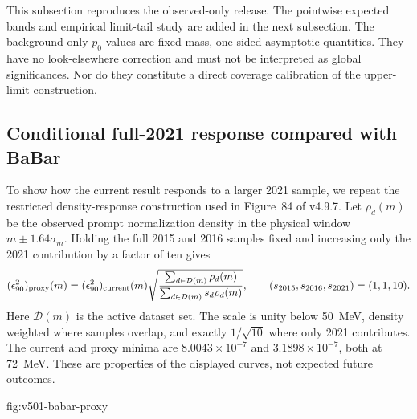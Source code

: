 This subsection reproduces the observed-only release. The pointwise expected
bands and empirical limit-tail study are added in the next subsection. The background-only $p_0$ values are fixed-mass, one-sided asymptotic
quantities. They have no look-elsewhere correction and must not be interpreted as
global significances. Nor do they constitute a direct coverage calibration of the
upper-limit construction.



\subsection{Conditional full-2021 response compared with BaBar}
\label{sec:v501-babar-proxy}
To show how the current result responds to a larger 2021 sample, we repeat
the restricted density-response construction used in Figure~84 of v4.9.7.
Let $\rho_d(m)$ be the observed prompt normalization density in the physical
window $m\pm1.64\sigma_m$. Holding the full 2015 and 2016 samples fixed and
increasing only the 2021 contribution by a factor of ten gives
\begin{equation}
 (\epsilon^2_{90})_{\rm proxy}(m)
 = (\epsilon^2_{90})_{\rm current}(m)
 \sqrt{\frac{\sum_{d\in\mathcal D(m)}\rho_d(m)}
 {\sum_{d\in\mathcal D(m)}s_d\rho_d(m)}} ,
 \qquad (s_{2015},s_{2016},s_{2021})=(1,1,10).
 \label{eq:v501-density-proxy}
\end{equation}
Here $\mathcal D(m)$ is the active dataset set. The scale is unity below
50~MeV, density weighted where samples overlap, and exactly $1/\sqrt{10}$
where only 2021 contributes. The current and proxy minima are
$8.0043\times10^{-7}$ and $3.1898\times10^{-7}$, both at 72~MeV.
These are properties of the displayed curves, not expected future outcomes.

{fig:v501-babar-proxy}
\FloatBarrier

